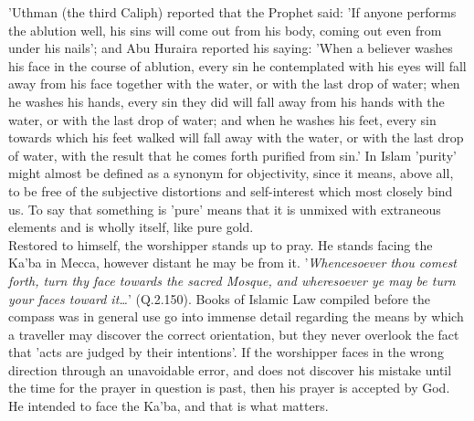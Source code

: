 \documentclass[11pt, b5paper, twoside]{book}
\begin{document}
'Uthman (the third Caliph) reported that the Prophet said: 'If anyone performs the ablution well, his 
sins will come out from his body, coming out even from under his nails'; and Abu Huraira reported his 
saying: 'When a believer washes his face in the course of ablution, every sin he contemplated with 
his eyes will fall away from his face together with the water, or with the last drop of water; when 
he washes his hands, every sin they did will fall away from his hands with the water, or with the 
last drop of water; and when he washes his feet, every sin towards which his feet walked will fall 
away with the water, or with the last drop of water, with the result that he comes forth purified 
from sin.' In Islam 'purity' might almost be defined as a synonym for objectivity, since it means, 
above all, to be free of the subjective distortions and self-interest which most closely bind us. To 
say that something is 'pure' means that it is unmixed with extraneous elements and is wholly itself, 
like pure gold. \\

Restored to himself, the worshipper stands up to pray. He stands facing the Ka'ba in Mecca, however 
distant he may be from it. '\emph{Whencesoever thou comest forth, turn thy face towards the sacred Mosque, 
and wheresoever ye may be turn your faces toward it\ldots{}}' (Q.2.150). Books of Islamic Law compiled 
before the compass was in general use go into immense detail regarding the means by which a traveller 
may discover the correct orientation, but they never overlook the fact that 'acts are judged by their 
intentions'. If the worshipper faces in the wrong direction through an unavoidable error, and does 
not discover his mistake until the time for the prayer in question is past, then his prayer is 
accepted by God. He intended to face the Ka'ba, and that is what matters. \\
\end{document}
